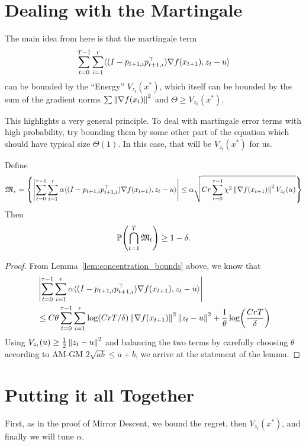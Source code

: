 \section{Dealing with the Martingale}
The main idea from here is that the martingale term 
\begin{align*}
    \sum_{t=0}^{T-1} \sum_{i=1}^r \langle (I-p_{t+1,i}p_{t+1,i}^\top) \grad f(x_{t+1}), z_t-u \rangle
\end{align*}
can be bounded by the ``Energy'' $V_{z_t}(x^*)$, which itself can be bounded by the sum of the gradient norms $\sum \mg{\grad f(x_t)}^2$ and $\Theta \geq V_{z_0}(x^*)$. 

This highlights a very general principle. To deal with martingale error terms with high probability, try bounding them by some other part of the equation which should have typical size $\Theta(1)$. In this case, that will be $V_{z_t}(x^*)$ for us.

\begin{lemma}
    Define
    \begin{align*}
        \mathfrak M_{\tau} = \set{\left|\sum_{t=0}^{\tau-1} \sum_{i=1}^r \alpha \langle (I-p_{t+1,i}p_{t+1,i}^\top) \grad f(x_{t+1}), z_t-u \rangle\right| \leq \alpha \sqrt{Cr \sum_{t=0}^{\tau-1} \chi^2 \mg{\grad f(x_{t+1})}^2 V_{z_t}(u)}}
    \end{align*}
    Then
    \begin{align*}
        \P(\bigcap_{t=1}^{T} \mathfrak M_{t}) \geq 1-\delta.
    \end{align*}
\end{lemma}
\begin{proof}
    From Lemma~\ref{lem:concentration_bounds} above, we know that 
    \begin{align*}
        &\left|\sum_{t=0}^{\tau-1} \sum_{i=1}^r \alpha \langle (I-p_{t+1,i}p_{t+1,i}^\top) \grad f(x_{t+1}), z_t-u \rangle \right| \\&\leq C \theta \sum_{t=0}^{\tau-1} \sum_{i=1}^r \log(CrT/\delta) \mg{\grad f(x_{t+1})}^2 \mg{z_t - u}^2 + \frac{1}{\theta} \log(\frac{CrT}{\delta})
    \end{align*}
    Using $V_{z_t}(u) \geq \frac 12\mg{z_t - u}^2$ and balancing the two terms by carefully choosing $\theta$ according to AM-GM $2\sqrt{ab} \leq a+b$, we arrive at the statement of the lemma.
\end{proof}

\section{Putting it all Together}
First, as in the proof of Mirror Descent, we bound the regret, then $V_{z_t}(x^*)$, and finally we will tune $\alpha$.

